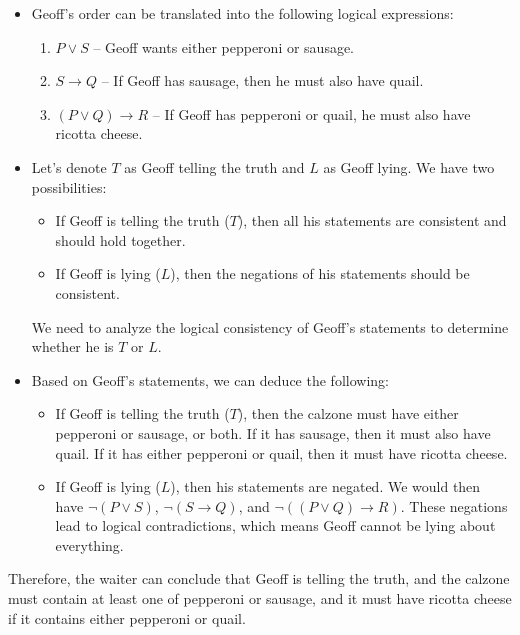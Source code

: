 \documentclass{article}
\begin{document}
\begin{itemize}
    \item 
        Geoff's order can be translated into the following logical expressions:
        \begin{enumerate}
            \item \( P \lor S \) -- Geoff wants either pepperoni or sausage.
            \item \( S \rightarrow Q \) -- If Geoff has sausage, then he must also have quail.
            \item \( (P \lor Q) \rightarrow R \) -- If Geoff has pepperoni or quail, he must also have ricotta cheese.
        \end{enumerate}

    \item
        Let's denote \( T \) as Geoff telling the truth and \( L \) as Geoff lying. We have two possibilities:
        \begin{itemize}
            \item If Geoff is telling the truth (\( T \)), then all his statements are consistent and should hold together.
            \item If Geoff is lying (\( L \)), then the negations of his statements should be consistent.
        \end{itemize}
        We need to analyze the logical consistency of Geoff's statements to determine whether he is \( T \) or \( L \).

    \item
        Based on Geoff's statements, we can deduce the following:
        \begin{itemize}
            \item If Geoff is telling the truth (\( T \)), then the calzone must have either pepperoni or sausage, or both. If it has sausage, then it must also have quail. If it has either pepperoni or quail, then it must have ricotta cheese.
            \item If Geoff is lying (\( L \)), then his statements are negated. We would then have \( \neg (P \lor S) \), \( \neg (S \rightarrow Q) \), and \( \neg ((P \lor Q) \rightarrow R) \). These negations lead to logical contradictions, which means Geoff cannot be lying about everything.
        \end{itemize}
\end{itemize}
Therefore, the waiter can conclude that Geoff is telling the truth, and the calzone must contain at least one of pepperoni or sausage, and it must have ricotta cheese if it contains either pepperoni or quail.
\end{document}
